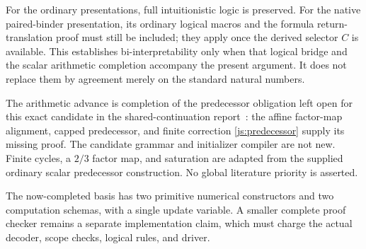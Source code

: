 For the ordinary presentations, full intuitionistic logic is preserved.
For the native paired-binder presentation, its ordinary logical macros
and the formula return-translation proof must still be included; they
apply once the derived selector $C$ is available.  This establishes
bi-interpretability only when that logical bridge and the scalar
arithmetic completion accompany the present argument.  It does not
replace them by agreement merely on the standard natural numbers.

The arithmetic advance is completion of the predecessor obligation
left open for this exact candidate in the shared-continuation
report~\cite{shared}: the affine factor-map alignment, capped
predecessor, and finite correction \eqref{js:predecessor} supply its
missing proof.  The candidate grammar and initializer compiler are not
new.  Finite cycles, a $2/3$ factor map, and saturation are adapted from
the supplied ordinary scalar predecessor construction.  No global
literature priority is asserted.

The now-completed basis has two primitive numerical constructors and
two computation schemas, with a single update variable.  A smaller
complete proof checker remains a separate implementation claim, which
must charge the actual decoder, scope checks, logical rules, and driver.
